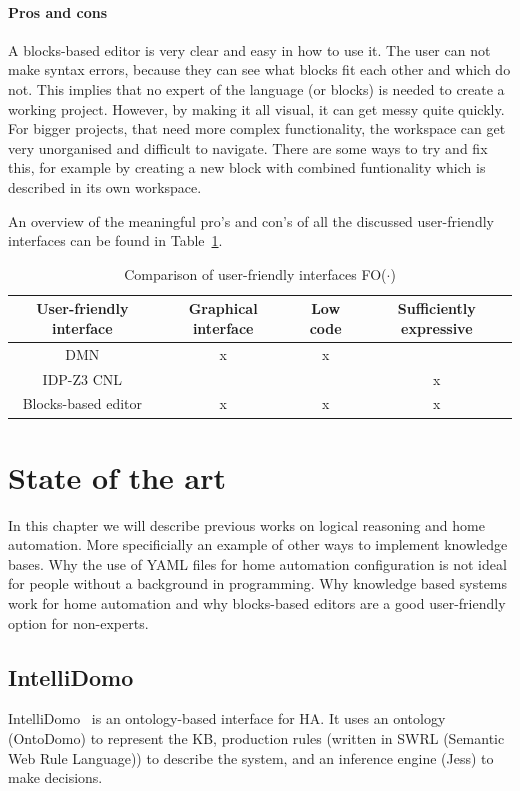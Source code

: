 \documentclass[11pt,a4paper]{report}
\newcommand{\fodot}{FO($\cdot$)\xspace}
\begin{document}
\paragraph{Pros and cons}
A blocks-based editor is very clear and easy in how to use it. The user can not make syntax errors, because they can see what blocks fit each other and which do not. This implies that no expert of the language (or blocks) is needed to create a working project. However, by making it all visual, it can get messy quite quickly. For bigger projects, that need more complex functionality, the workspace can get very unorganised and difficult to navigate. There are some ways to try and fix this, for example by creating a new block with combined funtionality which is described in its own workspace. 

An overview of the meaningful pro's and con's of all the discussed user-friendly interfaces can be found in Table~\ref{tab:user-friendly_comparison}.

\begin{table}
    \centering
    \caption{Comparison of user-friendly interfaces \fodot}
    \label{tab:user-friendly_comparison}
    \begin{tabular}{|c|c|c|c|}
    \hline
    User-friendly interface & Graphical interface & Low code & Sufficiently expressive \\ \hline
    DMN & x & x &   \\ \hline
    IDP-Z3 CNL &  &  & x  \\ \hline
    Blocks-based editor & x & x & x \\ \hline
    \end{tabular}
\end{table}

\section{State of the art}
In this chapter we will describe previous works on logical reasoning and home automation. More specificially an example of other ways to implement knowledge bases. Why the use of YAML files for home automation configuration is not ideal for people without a background in programming. Why knowledge based systems work for home automation and why blocks-based editors are a good user-friendly option for non-experts.  

\subsection{IntelliDomo}
IntelliDomo~\cite{SOTA_OntologyBased} is an ontology-based interface for HA. It uses an ontology (OntoDomo) to represent the KB, production rules (written in SWRL (Semantic Web Rule Language)) to describe the system, and an inference engine (Jess) to make decisions.
\end{document}

